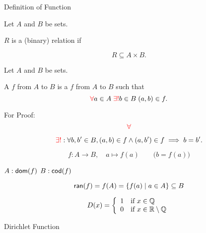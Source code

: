 \begin{frame}{}
  \begin{center}
    {\LARGE Definition of Function}
  \end{center}
\end{frame}

\begin{frame}{}
  \begin{definition}[Relation]
    Let $A$ and $B$ be sets.

    $R$ is a (binary) relation if

    \[
      R \subseteq A \times B.
    \]
  \end{definition}
\end{frame}

\begin{frame}{}
  \begin{definition}[Function]
    Let $A$ and $B$ be sets.

    A  $f$ from $A$ to $B$ is a  $f$ from $A$ to $B$ such that
    \[
      \textcolor{red}{\forall} a \in A\; \textcolor{red}{\exists!} b \in B\; (a, b) \in f.
    \]
  \end{definition}

  \pause
  \begin{alertblock}{For Proof:}
    \[
      \textcolor{red}{\forall}
    \]

    \[
      \textcolor{red}{\exists!}: \forall b, b' \in B, (a, b) \in f \land (a, b') \in f \implies b = b'.
    \]
  \end{alertblock}

  \pause
  \[
    f: A \to B, \quad a \mapsto f(a) \qquad\Big(b = f(a)\Big)
  \]

  \centerline{$A: \textsf{dom}(f)$ \qquad $B: \textsf{cod}(f)$}

  \pause
  \[
    \textsf{ran}(f) = f(A) = \{f(a) \mid a \in A\} \subseteq B
  \]
\end{frame}

\begin{frame}{}
  \[
    D(x) = \left\{\begin{array}{ll}
      1 & \text{if } x \in \mathbb{Q} \\
      0 & \text{if } x \in \mathbb{R} \setminus \mathbb{Q} 
    \end{array}\right.
  \]

  \vspace{0.60cm}
  \centerline{Dirichlet Function}
\end{frame}

